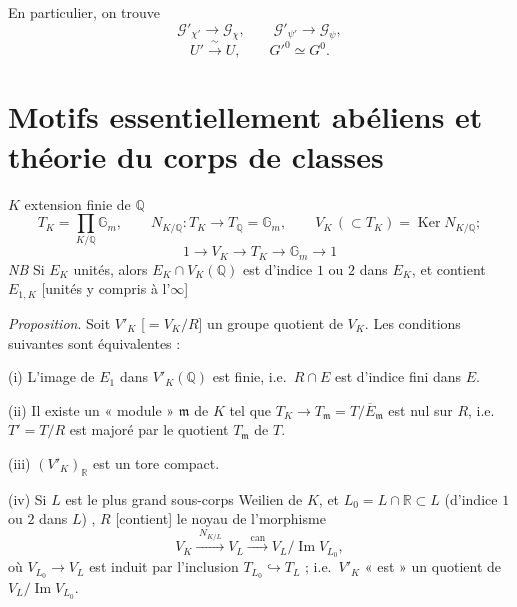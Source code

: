 \documentclass[11pt,a4paper]{article}
\begin{document}


En particulier, on trouve
\[
  \mathcal{G}'_{\chi'} \longrightarrow \mathcal{G}_{\chi} ,
  \qquad
  \mathcal{G}'_{\psi'} \longrightarrow \mathcal{G}_{\psi} ,
\]
\[
  U' \xrightarrow{\;\sim\;} U ,
  \qquad
  G'^{0} \simeq G^{0} .
\]

\section{Motifs essentiellement abéliens et théorie du corps de classes}


$K$ extension finie de $\mathbb{Q}$
\[
  T_{K} = \prod_{K/\mathbb{Q}} \mathbb{G}_{m} ,
  \qquad
  N_{K/\mathbb{Q}} : T_{K} \to T_{\mathbb{Q}} = \mathbb{G}_{m} ,
  \qquad
  V_{K} \, (\subset T_{K}) = \operatorname{Ker} N_{K/\mathbb{Q}} ;
\]
\[
  1 \longrightarrow V_{K} \longrightarrow T_{K} \longrightarrow \mathbb{G}_{m}
  \longrightarrow 1
\]
\emph{NB} Si $E_{K}$ unités, alors $E_{K} \cap V_{K}(\mathbb{Q})$ est d'indice
$1$ ou $2$ dans $E_{K}$, et contient $E_{1,K}$ [unités 
y compris à l'$\infty$]

\emph{Proposition}. Soit $V'_{K}$ [$= V_{K}/R$] un groupe quotient de $V_{K}$.
Les conditions suivantes sont équivalentes :

(i) L'image de $E_{1}$ dans $V'_{K}(\mathbb{Q})$ est finie, i.e.\ $R \cap E$ est
d'indice fini dans $E$.

(ii) Il existe un « module » $\mathfrak{m}$ de $K$ tel que $T_{K} \to
T_{\mathfrak{m}} = T/\overline{E}_{\mathfrak{m}}$ est nul sur $R$, i.e.\ $T' =
T/R$ est majoré par le quotient $T_{\mathfrak{m}}$ de $T$.

(iii) $(V'_{K})_{\mathbb{R}}$ est un tore compact.

(iv) Si $L$ \struck{\ill{}} est le plus grand sous-corps Weilien de $K$, et
$L_{0} = L \cap \mathbb{R} \subset L$ (d'indice $1$ ou $2$ dans $L$)
,  $R$  [contient]
le noyau de l'\struck{épi}morphisme \struck{$T$}
\[
  V_{K} \xrightarrow{\;N_{K/L}\;} V_{L}
  \xrightarrow{\;\mathrm{can}\;} V_{L}/\operatorname{Im} V_{L_{0}} ,
\]
où $V_{L_{0}} \to V_{L}$ est induit par l'inclusion $T_{L_{0}} \hookrightarrow
T_{L}$ ; i.e.\ $V'_{K}$ « est » un quotient de $V_{L}/\operatorname{Im}
V_{L_{0}}$.
\end{document}
